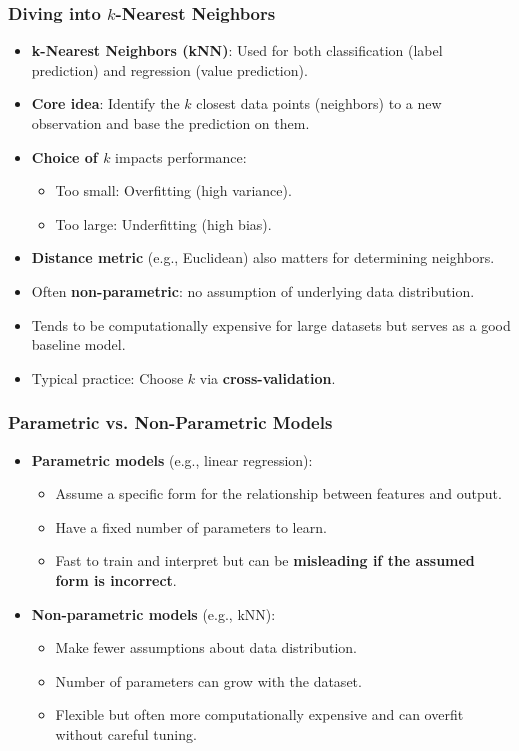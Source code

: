 \documentclass[aspectratio=169]{beamer}
\begin{document}
\begin{frame}
    \frametitle{Diving into $k$-Nearest Neighbors}
    \begin{itemize}
        \item \textbf{k-Nearest Neighbors (kNN)}: Used for both classification (label prediction) and regression (value prediction).
        \pause
        \item \textbf{Core idea}: Identify the $k$ closest data points (neighbors) to a new observation and base the prediction on them.
        \pause
        \item \textbf{Choice of $k$} impacts performance:
              \begin{itemize}
                  \item Too small: Overfitting (high variance).
                  \item Too large: Underfitting (high bias).
              \end{itemize}
        \pause
        \item \textbf{Distance metric} (e.g., Euclidean) also matters for determining neighbors.
        \pause
        \item Often \textbf{non-parametric}: no assumption of underlying data distribution.
        \pause
        \item Tends to be computationally expensive for large datasets but serves as a good baseline model.
        \pause
        \item Typical practice: Choose $k$ via \textbf{cross-validation}.
    \end{itemize}
\end{frame}

\begin{frame}
    \frametitle{Parametric vs. Non-Parametric Models}
    \begin{itemize}
        \item \textbf{Parametric models} (e.g., linear regression):
            \begin{itemize}
                \item Assume a specific form for the relationship between features and output.
                \item Have a fixed number of parameters to learn.
                \item Fast to train and interpret but can be \textbf{misleading if the assumed form is incorrect}.
            \end{itemize}
		\pause
        \item \textbf{Non-parametric models} (e.g., kNN):
            \begin{itemize}
                \item Make fewer assumptions about data distribution.
                \item Number of parameters can grow with the dataset.
                \item Flexible but often more computationally expensive and can overfit without careful tuning.
            \end{itemize}
    \end{itemize}
\end{frame}
\end{document}
